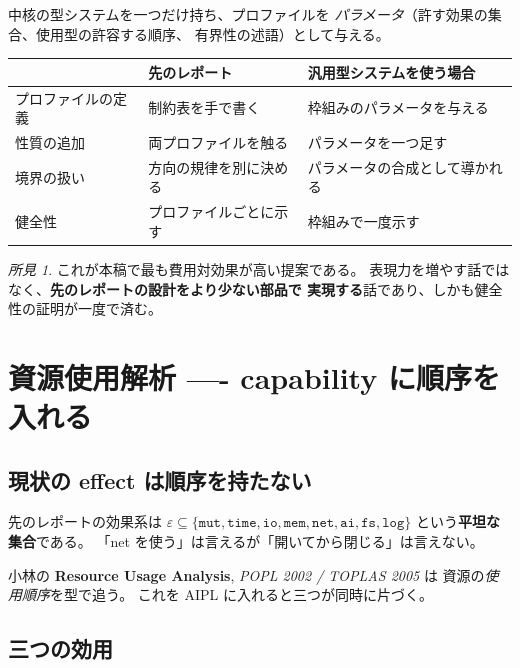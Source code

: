 \documentclass[11pt,a4paper]{ltjsarticle}
\theoremstyle{remark}
\newtheorem{finding}{所見}
\newcommand{\pp}[2]{\textbf{#1}, \emph{#2}}
\begin{document}
中核の型システムを一つだけ持ち、プロファイルを
\emph{パラメータ}（許す効果の集合、使用型の許容する順序、
有界性の述語）として与える。

\begin{center}
\small
\begin{tabular}{@{}lll@{}}
\toprule
 & 先のレポート & 汎用型システムを使う場合 \\
\midrule
プロファイルの定義 & 制約表を手で書く &
  枠組みのパラメータを与える \\
性質の追加 & 両プロファイルを触る &
  パラメータを一つ足す \\
境界の扱い & 方向の規律を別に決める &
  パラメータの合成として導かれる \\
健全性 & プロファイルごとに示す &
  枠組みで一度示す \\
\bottomrule
\end{tabular}
\end{center}

\begin{finding}
これが本稿で最も費用対効果が高い提案である。
表現力を増やす話ではなく、\textbf{先のレポートの設計をより少ない部品で
実現する}話であり、しかも健全性の証明が一度で済む。
\end{finding}

\section{資源使用解析 ---- capability に順序を入れる}

\subsection{現状の effect は順序を持たない}

先のレポートの効果系は
$\varepsilon \subseteq \{\texttt{mut},\texttt{time},\texttt{io},
\texttt{mem},\texttt{net},\texttt{ai},\texttt{fs},\texttt{log}\}$
という\textbf{平坦な集合}である。
「net を使う」は言えるが「開いてから閉じる」は言えない。

小林の \pp{Resource Usage Analysis}{POPL 2002 / TOPLAS 2005} は
資源の\emph{使用順序}を型で追う。
これを AIPL に入れると三つが同時に片づく。

\subsection{三つの効用}
\end{document}
